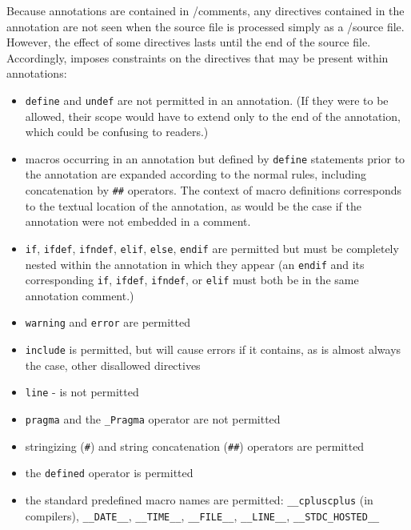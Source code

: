 Because \acslb annotations are contained in \C/\cpp comments,
any directives contained in the annotation are not seen when the source file is processed simply as a \C/\cpp source file. However, the effect of some directives lasts until the end of the source file. 
Accordingly, \acslpp imposes constraints on the directives that may be present within annotations:
\begin{itemize}
        \item \texttt{define} and \texttt{undef} are not permitted in an annotation. (If they were to be allowed, their scope would have to extend only to the end of the annotation, which could be confusing to readers.)
        \item macros occurring in an annotation but defined by \texttt{define} statements prior to the annotation are expanded according to the normal rules, including concatenation by \texttt{\#\#} operators.
        The context of macro definitions corresponds to the textual location of the annotation, as would be the case if the
        annotation were not embedded in a comment.
        \item \texttt{if}, \texttt{ifdef}, \texttt{ifndef}, \texttt{elif}, \texttt{else}, \texttt{endif} are permitted but must be completely nested within the annotation in which they appear (an \texttt{endif} and its corresponding \texttt{if}, \texttt{ifdef}, \texttt{ifndef}, or \texttt{elif} must both be in the same annotation comment.)
        \item \texttt{warning} and \texttt{error} are permitted
        \item \texttt{include} is permitted, but will cause errors if it contains, as is almost always the case, other disallowed directives
        \item \texttt{line} - is not permitted
        \item \texttt{pragma} and the \texttt{\_Pragma} operator are not permitted
        \item stringizing (\verb|#|) and string concatenation (\verb|##|) operators are permitted
        \item the \verb|defined| operator is permitted
        \item the standard predefined macro names are permitted:
        \texttt{\_\_cpluscplus} (in \cpp compilers),
        \texttt{\_\_DATE\_\_},
    \texttt{\_\_TIME\_\_},
        \texttt{\_\_FILE\_\_},
        \texttt{\_\_LINE\_\_},
        \texttt{\_\_STDC\_HOSTED\_\_}
\end{itemize}

